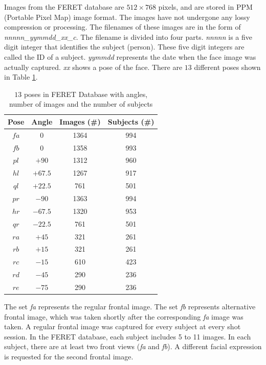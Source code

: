 Images from the \mbox{FERET} database are $512\times 768$ pixels, and are stored in \mbox{PPM} (Portable Pixel Map) image format. The images have not undergone any lossy compression or processing. The filenames of these images are in the form of \textit{nnnnn\_yymmdd\_xx\_c}. The filename is divided into four parts. \textit{nnnnn} is a five digit integer that identifies the subject (person). These five digit integers are called the ID of a subject. \textit{yymmdd} represents the date when the face image was actually captured. \textit{xx} shows a pose of the face. There are $13$ different poses shown in \mbox{Table} \ref{tab:feretposes}.
\begin{table}[ht]
 \begin{center}
\caption{$13$ poses in FERET Database with angles, number of images and the number of subjects} 
\begin{tabular}{|c||c|c|c|}
\hline
 Pose & Angle & Images (\#) & Subjects (\#) \\
\hline
\hline
$fa$ & $0$ & 1364 & 994 \\
$fb$ & $0$ & 1358 & 993 \\
$pl$ & $+90$ & 1312 & 960 \\
$hl$ & $+67.5$ & 1267 & 917 \\
$ql$ & $+22.5$ & 761 & 501 \\
$pr$ & $-90$ & 1363 & 994 \\
$hr$ & $-67.5$ & 1320 & 953 \\
$qr$ & $-22.5$ & 761 & 501 \\
$ra$ & $+45$ & 321 & 261 \\
$rb$ & $+15$ & 321 & 261 \\
$rc$ & $-15$ & 610 & 423 \\
$rd$ & $-45$ & 290 & 236 \\
$re$ & $-75$ & 290 & 236 \\
\hline
\end{tabular} 
 \label{tab:feretposes}
 \end{center}
\end{table} 
The set \textit{fa} represents the regular frontal image. The set \textit{fb} represents alternative frontal image, which was taken shortly after the corresponding \textit{fa} image was taken. A regular frontal image was captured for every subject at every shot session. In the \mbox{FERET} database, each subject includes 5 to 11 images. In each subject, there are at least two front views (\textit{fa} and \textit{fb}). A different facial expression is requested for the second frontal image. 
